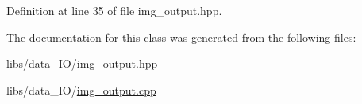 Definition at line 35 of file img\-\_\-output.\-hpp.



The documentation for this class was generated from the following files\-:\begin{DoxyCompactItemize}
\item 
libs/data\-\_\-\-I\-O/\hyperlink{img__output_8hpp}{img\-\_\-output.\-hpp}\item 
libs/data\-\_\-\-I\-O/\hyperlink{img__output_8cpp}{img\-\_\-output.\-cpp}\end{DoxyCompactItemize}
